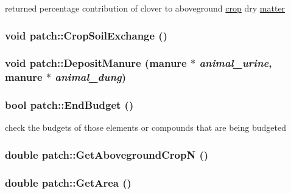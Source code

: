 returned percentage contribution of clover to aboveground \hyperlink{classcrop}{crop} dry \hyperlink{classmatter}{matter} \hypertarget{classpatch_a8748ec3076874edd7d38ff2c8680e6a1}{
\subsubsection[{CropSoilExchange}]{\setlength{\rightskip}{0pt plus 5cm}void patch::CropSoilExchange ()}}
\label{classpatch_a8748ec3076874edd7d38ff2c8680e6a1}
\hypertarget{classpatch_a710f7413560c8b891d35212341731b02}{
\subsubsection[{DepositManure}]{\setlength{\rightskip}{0pt plus 5cm}void patch::DepositManure ({\bf manure} $\ast$ {\em animal\_\-urine}, \/  {\bf manure} $\ast$ {\em animal\_\-dung})}}
\label{classpatch_a710f7413560c8b891d35212341731b02}
\hypertarget{classpatch_a081e88d1eef85a499e8f466dbe0bf546}{
\subsubsection[{EndBudget}]{\setlength{\rightskip}{0pt plus 5cm}bool patch::EndBudget ()}}
\label{classpatch_a081e88d1eef85a499e8f466dbe0bf546}


check the budgets of those elements or compounds that are being budgeted \hypertarget{classpatch_aa68d48a5d0a2c8b3a222b141d0d5c276}{
\subsubsection[{GetAbovegroundCropN}]{\setlength{\rightskip}{0pt plus 5cm}double patch::GetAbovegroundCropN ()}}
\label{classpatch_aa68d48a5d0a2c8b3a222b141d0d5c276}
\hypertarget{classpatch_ae5ed6219bcd53dc67ca0dbbf33109649}{
\subsubsection[{GetArea}]{\setlength{\rightskip}{0pt plus 5cm}double patch::GetArea ()}}
\label{classpatch_ae5ed6219bcd53dc67ca0dbbf33109649}


